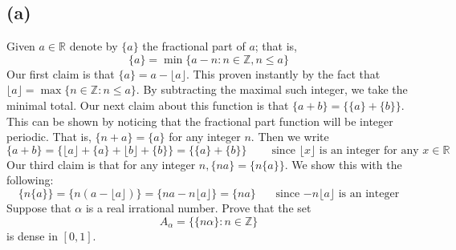 \documentclass{article}
\begin{document}
    \subsection*{(a)} 
        Given $a \in \mathbb{R}$ denote by $\{a\}$ the 
        fractional part of $a$; that is,
        \[ 
            \{a\} = \min \{a-n:n\in\mathbb{Z},n\leq a\}    
        \]
        Our first claim is that $\{a\} = a - \lfloor a \rfloor $. This proven instantly by the fact that $\lfloor a \rfloor = \max\{n \in \mathbb{Z} : n \leq a\}$.
        By subtracting the maximal such integer, we take the minimal total. Our next claim about this function is that $\{a + b\} = \{\{a\} + \{b\}\}$.
        This can be shown by noticing that the fractional part function will be integer periodic. That is, $\{n + a\} = \{a\}$ for any integer $n$. Then
        we write
        \[
            \{a + b\} = \{ \lfloor a \rfloor + \{a\} + \lfloor b \rfloor + \{b\} \} = \{\{a\} + \{b\}\} \ \ \ \ \ \ \ \ \ \ \text{since $\lfloor x \rfloor$ is an integer for any $x \in \mathbb{R}$}
        \]
        Our third claim is that for any integer $n, \{na\} = \{n\{a\}\}$. We show this with the following:
        \[
            \{n\{a\}\} = \{n (a - \lfloor a \rfloor )\} = \{na - n \lfloor a \rfloor \} = \{na\} \ \ \ \ \ \ \ \ \text{since $-n \lfloor a \rfloor$ is an integer}
        \]
        Suppose that $\alpha$ is a real irrational number. Prove that the set 
        \[
            A_\alpha = \{ \{n\alpha\} : n \in \mathbb{Z}\}
        \]
        is dense in $[0,1]$.
\end{document}
